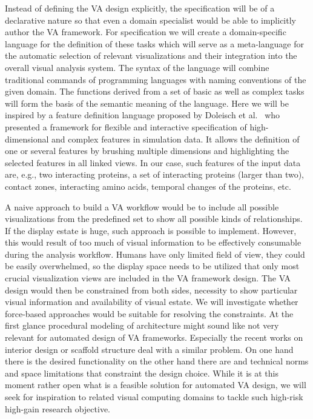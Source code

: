 \documentclass[11pt,a4paper,titlepage,oneside,onecolumn]{article}
\begin{document}
Instead of defining the VA design explicitly, the specification will be of a declarative nature so that even a domain specialist would be able to implicitly author the VA framework.
For specification we will create a domain-specific language for the definition of these tasks which will serve as a meta-language for the automatic selection of relevant visualizations and their integration into the overall visual analysis system. The syntax of the language will combine traditional commands of programming languages with naming conventions of the given domain. The functions derived from a set of basic as well as complex tasks will form the basis of the semantic meaning of the language. Here we will be inspired by a feature definition language proposed by Doleisch et al.~\cite{Doleisch} who presented a framework for flexible and interactive specification of high-dimensional and complex features in simulation data. It allows the definition of one or several features by brushing multiple dimensions and highlighting the selected features in all linked views.
In our case, such features of the input data are, e.g., two interacting proteins, a set of interacting proteins (larger than two), contact zones, interacting amino acids, temporal changes of the proteins, etc. 

A naive approach to build a VA workflow would be to include all possible visualizations from the predefined set to show all possible kinds of relationships. If the display estate is huge, such approach is possible to implement. However, this would result of too much of visual information to be effectively consumable during the analysis workflow. Humans have only limited field of view, they could be easily overwhelmed, so the display space needs to be utilized that only most crucial visualization views are included in the VA framework design. The VA design would then be constrained from both sides, necessity to show particular visual information and availability of visual estate. We will investigate whether force-based approaches would be suitable for resolving the constraints. At the first glance procedural modeling of architecture might sound like not very relevant for automated design of VA frameworks. Especially the recent works on interior design or scaffold structure deal with a similar problem. On one hand there is the desired functionality on the other hand there are and technical norms and space limitations that constraint the design choice. While it is at this moment rather open what is a feasible solution for automated VA design, we will seek for inspiration to related visual computing domains to tackle such high-risk high-gain research objective.
\end{document}

